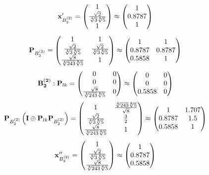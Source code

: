 \documentclass[10pt,a4paper]{article}
\begin{document}
	\[
		\bold{x}'_{B_2^{(2)}} = 
		\begin{pmatrix}
			{1} {} \\
			\frac{\sqrt{2}} {\sqrt[4]{3}\sqrt[8]{5}} \\
			{1} {} \\
		\end{pmatrix}
		\approx
		\begin{pmatrix}
			1        \\
			0.8787   \\
			1        \\
		\end{pmatrix}
	\]
	\[
		\bold{P}_{B_2^{(2)}} = 
		\begin{pmatrix}
			{1} {} & {1} {} \\
			\frac{\sqrt{2}} {\sqrt[4]{3}\sqrt[8]{5}} & \frac{\sqrt{2}} {\sqrt[4]{3}\sqrt[8]{5}} \\
			\frac{\sqrt{8}} {\sqrt[4]{243}\sqrt[8]{5}} & {1} {} \\
		\end{pmatrix}
		\approx
		\begin{pmatrix}
			1        & 1        \\
			0.8787   & 0.8787   \\
			0.5858   & 1        \\
		\end{pmatrix}
	\]
	\[
		\bold{B_2^{(2)}}: \bold{P}_{lk} = 
		\begin{pmatrix}
			{{0}} {} & {{0}} {} \\
			{{0}} {} & {{0}} {} \\
			\frac{\sqrt{8}} {\sqrt[4]{243}\sqrt[8]{5}} & {{0}} {} \\
		\end{pmatrix}
		\approx
		\begin{pmatrix}
			0        & 0        \\
			0        & 0        \\
			0.5858   & 0        \\
		\end{pmatrix}
	\]
	\[
		\bold{P}_{B_2^{(2)}}\left(\bold{I} \oplus \bold{P}_{lk}\bold{P}_{B_2^{(2)}}\right) = 
		\begin{pmatrix}
			{1} {} & \frac{\sqrt[4]{243}\sqrt[8]{5}} {\sqrt{8}} \\
			\frac{\sqrt{2}} {\sqrt[4]{3}\sqrt[8]{5}} & \frac{{3}} {{2}} \\
			\frac{\sqrt{8}} {\sqrt[4]{243}\sqrt[8]{5}} & {1} {} \\
		\end{pmatrix}
		\approx
		\begin{pmatrix}
			1        & 1.707    \\
			0.8787   & 1.5      \\
			0.5858   & 1        \\
		\end{pmatrix}
	\]
	\[
		\bold{x}''_{B_2^{(2)}} = 
		\begin{pmatrix}
			{1} {} \\
			\frac{\sqrt{2}} {\sqrt[4]{3}\sqrt[8]{5}} \\
			\frac{\sqrt{8}} {\sqrt[4]{243}\sqrt[8]{5}} \\
		\end{pmatrix}
		\approx
		\begin{pmatrix}
			1        \\
			0.8787   \\
			0.5858   \\
		\end{pmatrix}
	\]

\end{document}
